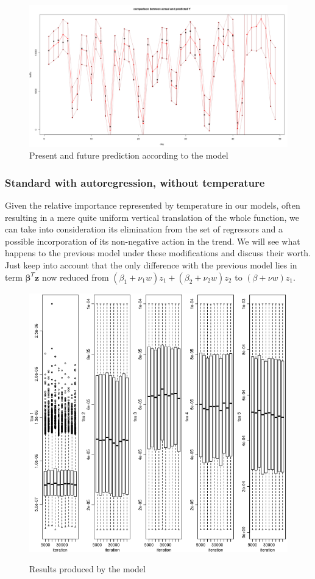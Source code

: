 \documentclass[11pt,twoside]{report}
\begin{document}
\begin{figure}[H]
	\centering
	\includegraphics[width=150 mm]{pictures/m1_future.png}
	\caption{Present and future prediction according to the model}
	\label{fig:M1_future}
\end{figure}

\subsubsection{Standard with autoregression, without temperature}
Given the relative importance represented by temperature in our models, often resulting in a mere quite uniform vertical translation of the whole function, we can take into consideration its elimination from the set of regressors and a possible incorporation of its non-negative action in the trend. We will see what happens to the previous model under these modifications and discuss their worth. Just keep into account that the only difference with the previous model lies in term $ \boldsymbol{\beta}^T\mathbf{z} $ now reduced from $ (\beta_1+\nu_1w)z_1 + (\beta_2+\nu_2w)z_2$ to $(\beta+\nu w)z_1$.

\begin{figure}[H]
	\centering
	\includegraphics[width=46 mm]{pictures/m3_b1.png}
	\label{fig:M3_b1}
	\caption{Results produced by the model}
\end{figure}
\end{document}
